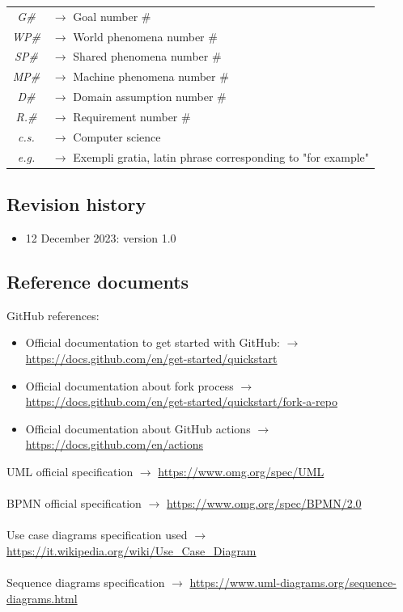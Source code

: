\documentclass{article}
\begin{document}
{\begin{xltabular}{\textwidth}{ >{\raggedright\arraybackslash}c >{\raggedright\arraybackslash}X }
    \textit{G\#} & $\rightarrow$ Goal number \#
    \\
    \textit{WP\#} & $\rightarrow$ World phenomena number \#
    \\
    \textit{SP\#} & $\rightarrow$ Shared phenomena number \#
    \\
    \textit{MP\#} & $\rightarrow$ Machine phenomena number \#
    \\
    \textit{D\#} & $\rightarrow$ Domain assumption number \#
    \\
    \textit{R.\#} & $\rightarrow$ Requirement number \#
    \\
    \textit{c.s.} & $\rightarrow$ Computer science
    \\
    \textit{e.g.} & $\rightarrow$ Exempli gratia, latin phrase corresponding to "for example"
\end{xltabular}

\subsection{Revision history}
\begin{itemize}
    \item 12 December 2023: version 1.0
\end{itemize}
\subsection{Reference documents}
GitHub references:
\begin{itemize}
    \item Official documentation to get started with GitHub: $\rightarrow$ \url{https://docs.github.com/en/get-started/quickstart}
    \item Official documentation about fork process $\rightarrow$ \url{https://docs.github.com/en/get-started/quickstart/fork-a-repo}
    \item Official documentation about GitHub actions $\rightarrow$ \url{https://docs.github.com/en/actions}
\end{itemize}
UML official specification $\rightarrow$ \url{https://www.omg.org/spec/UML}
\\ \\
BPMN official specification $\rightarrow$ \url{https://www.omg.org/spec/BPMN/2.0}
\\ \\
Use case diagrams specification used $\rightarrow$ \url{https://it.wikipedia.org/wiki/Use_Case_Diagram}
\\ \\
Sequence diagrams specification $\rightarrow$ \url{https://www.uml-diagrams.org/sequence-diagrams.html}
}
\end{document}
